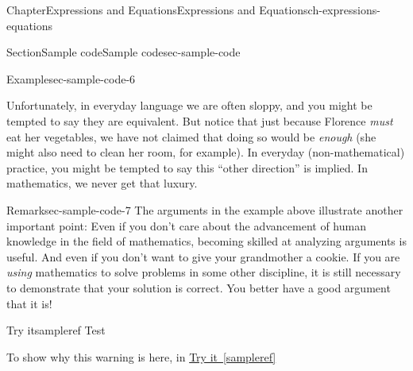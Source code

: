 \documentclass[twoside,11pt,]{book}
\newcommand{\xreffont}{\relax}
\numberwithin{equation}{chapter}
\begin{document}
\begin{chapterptx}{Chapter}{Expressions and Equations}{}{Expressions and Equations}{}{}{ch-expressions-equations}
\begin{sectionptx}{Section}{Sample code}{}{Sample code}{}{}{sec-sample-code}
\begin{example}{Example}{}{sec-sample-code-6}
\par
Unfortunately, in everyday language we are often sloppy, and you might be tempted to say they are equivalent. But notice that just because Florence \emph{must} eat her vegetables, we have not claimed that doing so would be \emph{enough} (she might also need to clean her room, for example). In everyday (non-mathematical) practice, you might be tempted to say this ``other direction'' is implied. In mathematics, we never get that luxury.%
\end{example}
\begin{remark}{Remark}{}{sec-sample-code-7}%
The arguments in the example above illustrate another important point: Even if you don't care about the advancement of human knowledge in the field of mathematics, becoming skilled at analyzing arguments is useful. And even if you don't want to give your grandmother a cookie. If you are \emph{using} mathematics to solve problems in some other discipline, it is still necessary to demonstrate that your solution is correct. You better have a good argument that it is!%
\end{remark}
\begin{inlineexercise}{Try it}{}{sampleref}%
Test%
\end{inlineexercise}%
To show why this warning is here, in \hyperref[sampleref]{Try it~{\xreffont\ref{sampleref}}}%
\end{sectionptx}
\end{chapterptx}
\end{document}
